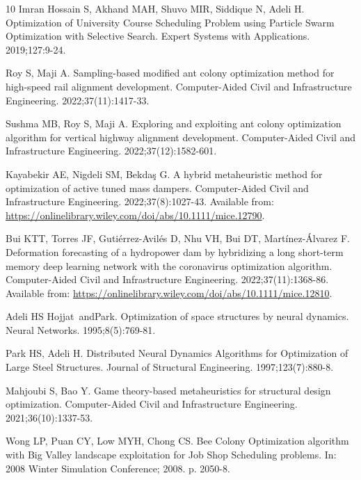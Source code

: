 \documentclass[icae]{iosart2x}
\begin{document}
\begin{thebibliography}{10}
{Imran Hossain} S, Akhand MAH, Shuvo MIR, Siddique N, Adeli H.
\newblock Optimization of University Course Scheduling Problem using Particle
  Swarm Optimization with Selective Search.
\newblock Expert Systems with Applications. 2019;127:9-24.

Roy S, Maji A.
\newblock Sampling-based modified ant colony optimization method for high-speed
  rail alignment development.
\newblock Computer-Aided Civil and Infrastructure Engineering.
  2022;37(11):1417-33.

Sushma MB, Roy S, Maji A.
\newblock Exploring and exploiting ant colony optimization algorithm for
  vertical highway alignment development.
\newblock Computer-Aided Civil and Infrastructure Engineering.
  2022;37(12):1582-601.

Kayabekir AE, Nigdeli SM, Bekdaş G.
\newblock A hybrid metaheuristic method for optimization of active tuned mass
  dampers.
\newblock Computer-Aided Civil and Infrastructure Engineering.
  2022;37(8):1027-43.
\newblock Available from:
  \url{https://onlinelibrary.wiley.com/doi/abs/10.1111/mice.12790}.

Bui KTT, Torres JF, Gutiérrez-Avilés D, Nhu VH, Bui DT, Martínez-Álvarez F.
\newblock Deformation forecasting of a hydropower dam by hybridizing a long
  short-term memory deep learning network with the coronavirus optimization
  algorithm.
\newblock Computer-Aided Civil and Infrastructure Engineering.
  2022;37(11):1368-86.
\newblock Available from:
  \url{https://onlinelibrary.wiley.com/doi/abs/10.1111/mice.12810}.

Adeli HS Hojjat~andPark.
\newblock Optimization of space structures by neural dynamics.
\newblock Neural Networks. 1995;8(5):769-81.

Park HS, Adeli H.
\newblock Distributed Neural Dynamics Algorithms for Optimization of Large
  Steel Structures.
\newblock Journal of Structural Engineering. 1997;123(7):880-8.

Mahjoubi S, Bao Y.
\newblock Game theory-based metaheuristics for structural design optimization.
\newblock Computer-Aided Civil and Infrastructure Engineering.
  2021;36(10):1337-53.

Wong LP, Puan CY, Low MYH, Chong CS.
\newblock Bee Colony Optimization algorithm with Big Valley landscape
  exploitation for Job Shop Scheduling problems.
\newblock In: 2008 Winter Simulation Conference; 2008. p. 2050-8.


\end{thebibliography}
\end{document}
